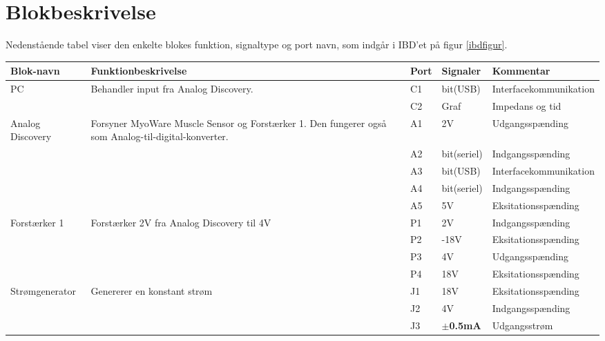 \section{Blokbeskrivelse} \label{blokbesk}
Nedenstående tabel viser den enkelte blokes funktion, signaltype og port navn, som indgår i IBD'et på figur \ref{ibdfigur}.

\begin{table} [H]
  \centering

\begin{tabular}  {|p{3cm}|p{4cm}|p{1cm}|p{1.5cm}|p{3.8cm}| }

\hline
	
	\textbf{Blok-navn} & \textbf{Funktionbeskrivelse}  & \textbf{Port} & \textbf{Signaler} & \textbf{Kommentar} \\ \cline{3-5} \hline
	
PC & Behandler input fra Analog Discovery.  &  C1 & bit(USB)  & Interfacekommunikation  \\ \cline{3-5}
	 &  & C2 & Graf & Impedans og tid \\ 
	 
	 \hline
	 
	 
Analog Discovery  & Forsyner MyoWare Muscle Sensor og Forstærker 1. Den fungerer også som  Analog-til-digital-konverter.  &  A1 & 2V & Udgangsspænding    \\ \cline{3-5}
	 &  & A2 & bit(seriel) & Indgangsspænding \\ \cline{3-5}
	 &  & A3 & bit(USB)  & Interfacekommunikation \\
 \cline{3-5}
	 &  & A4 & bit(seriel)  & Indgangsspænding 	 
	 \\
 \cline{3-5}
	 &  & A5 & 5V  & Eksitationsspænding 	 	 
	 
	 
	  \\ \hline	  
	 
		 
 Forstærker 1 & Forstærker 2V fra Analog Discovery til 4V   &  P1 & 2V & Indgangsspænding   \\ \cline{3-5}
	 &  & P2 & $   ${-18V}  & Eksitationsspænding \\ \cline{3-5}
	 &  & P3 & 4V  & Udgangsspænding   \\ 
	\cline{3-5}
	 &  & P4 & $   ${18V}  & Eksitationsspænding   
	 
	  \\ \hline	 	
	 
	 
Strømgenerator  & Genererer en konstant strøm &  J1 &$   ${18V} & Eksitationsspænding    \\ \cline{3-5}
	 &  & J2 & 4V  & Indgangsspænding \\ \cline{3-5}
	 &  & J3 & $ \pm  $\textbf{0.5mA}  & Udgangsstrøm  \\ \cline{3-5}
	

\end{tabular}
\end{table}
